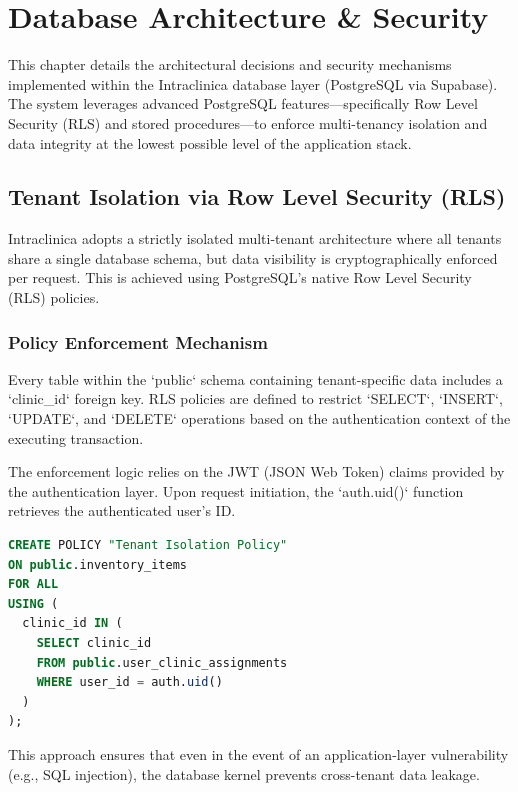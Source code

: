 \documentclass[12pt, openright, twoside, a4paper, english, french, spanish]{abntex2}
\begin{document}
\frenchspacing 

\imprimircapa
\imprimirfolhaderosto
\tableofcontents*

\chapter{Database Architecture \& Security}

This chapter details the architectural decisions and security mechanisms implemented within the Intraclinica database layer (PostgreSQL via Supabase). The system leverages advanced PostgreSQL features—specifically Row Level Security (RLS) and stored procedures—to enforce multi-tenancy isolation and data integrity at the lowest possible level of the application stack.

\section{Tenant Isolation via Row Level Security (RLS)}

Intraclinica adopts a strictly isolated multi-tenant architecture where all tenants share a single database schema, but data visibility is cryptographically enforced per request. This is achieved using PostgreSQL's native Row Level Security (RLS) policies.

\subsection{Policy Enforcement Mechanism}
Every table within the `public` schema containing tenant-specific data includes a `clinic_id` foreign key. RLS policies are defined to restrict `SELECT`, `INSERT`, `UPDATE`, and `DELETE` operations based on the authentication context of the executing transaction.

The enforcement logic relies on the JWT (JSON Web Token) claims provided by the authentication layer. Upon request initiation, the `auth.uid()` function retrieves the authenticated user's ID.

\begin{lstlisting}[language=SQL, caption=RLS Policy Example for Inventory Items]
CREATE POLICY "Tenant Isolation Policy"
ON public.inventory_items
FOR ALL
USING (
  clinic_id IN (
    SELECT clinic_id 
    FROM public.user_clinic_assignments 
    WHERE user_id = auth.uid()
  )
);
\end{lstlisting}

This approach ensures that even in the event of an application-layer vulnerability (e.g., SQL injection), the database kernel prevents cross-tenant data leakage.
\end{document}

